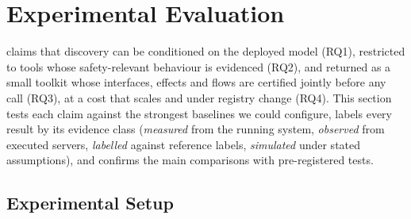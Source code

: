 \section{Experimental Evaluation}
\label{sec:ev}

\pamcp{} claims that discovery can be conditioned on the deployed model (RQ1), restricted to tools whose
safety-relevant behaviour is evidenced (RQ2), and returned as a small toolkit whose interfaces, effects and
flows are certified jointly before any call (RQ3), at a cost that scales and under registry change (RQ4). This
section tests each claim against the strongest baselines we could configure, labels every result by its evidence
class (\emph{measured} from the running system, \emph{observed} from executed servers, \emph{labelled} against
reference labels, \emph{simulated} under stated assumptions), and confirms the main comparisons with
pre-registered tests.

\subsection{Experimental Setup}
\label{sec:ev-setup}

